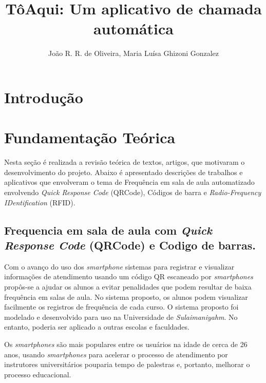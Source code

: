 \documentclass[12pt]{article}
\title{TôAqui: Um aplicativo de chamada automática}
\author{João R. R. de Oliveira\inst{1}, 
Maria Luísa Ghizoni Gonzalez\inst{2}}
\begin{document}
\maketitle

\begin{abstract}

\end{abstract}



\begin{resumo}

\end{resumo}

\section{Introdução}





\section{Fundamentação Teórica}
Nesta seção é realizada a revisão teórica de textos, artigos, que motivaram o desenvolvimento do projeto. Abaixo é apresentado descrições de trabalhos e aplicativos que envolveram o tema de Frequência em sala de aula automatizado envolvendo \textit{Quick Response Code} (QRCode), Códigos de barra e \textit{Radio-Frequency IDentification} (RFID).


\subsection{Frequencia em sala de aula com \textit{Quick Response Code} (QRCode) e Codigo de barras.}
Com o avanço do uso dos \textit{smartphone} sistemas para registrar e visualizar informações de atendimento usando um código QR escaneado por \textit{smartphones} propôs-se a ajudar os alunos a evitar penalidades que podem resultar de baixa frequência em salas de aula. No sistema proposto, os alunos podem visualizar facilmente os registros de frequência de cada curso. O sistema proposto foi modelado e desenvolvido para uso na Universidade de \textit{Sulaimaniyahm}. No entanto, poderia ser aplicado a outras escolas e faculdades.\cite{QRcode}

Os \textit{smartphones} são mais populares entre os usuários na idade de cerca de 26 anos, usando \textit{smartphones} para acelerar o processo de atendimento por instrutores universitários pouparia tempo de palestras e, portanto, melhorar o processo educacional.\cite{QRcode2}
\end{document}
